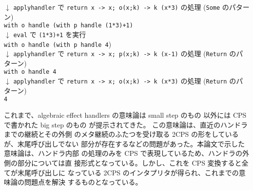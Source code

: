 \hspace{20pt}$\downarrow$ \texttt{apply\US{}handler} で \texttt{\LBR{}return x -> x; o(x;k) -> k (x*3)\RBR} の処理 (\texttt{Some} のパターン)\\
\hspace{20pt}\texttt{with \LBR{}o\RBR{} handle (with \LBR{}p\RBR{} handle (1*3)+1)}\\
\hspace{20pt}$\downarrow$ \texttt{eval} で \texttt{(1*3)+1} を実行\\
\hspace{20pt}\texttt{with \LBR{}o\RBR{} handle (with \LBR{}p\RBR{} handle 4})\\
\hspace{20pt}$\downarrow$ \texttt{apply\US{}handler} で \texttt{\LBR{}return x -> x; p(x;k) -> k (x-1)\RBR} の処理 (\texttt{Return} のパターン)\\
\hspace{20pt}\texttt{with \LBR{}o\RBR{} handle 4}\\
\hspace{20pt}$\downarrow$ \texttt{apply\US{}handler} で \texttt{\LBR{}return x -> x; o(x;k) -> k (x*3)\RBR} の処理 (\texttt{Return} のパターン)\\
\hspace{20pt}\texttt{4}
\vspace{5pt}

これまで、algebraic effect handlers の意味論は small step のもの
\cite{10.1145/2500365.2500590, PRETNAR201519}
以外には
CPS で書かれた big step のもの
\cite{e6cb0c3222794e48bf38cf44e46fe4aa}
が提示されてきた。
この意味論は、直近のハンドラまでの継続とその外側
のメタ継続のふたつを受け取る 2CPS の形をしているが、末尾呼び出しでない
部分が存在するなどの問題があった。本論文で示した意味論は、ハンドラ内部
の処理のみを CPS で表現しているため、ハンドラの外側の部分については直
接形式となっている。しかし、これを CPS 変換すると全てが末尾呼び出しに
なっている 2CPS のインタプリタが得られ、これまでの意味論の問題点を解決
するものとなっている。
